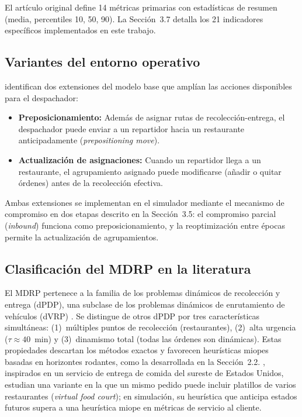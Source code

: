 \documentclass[12pt,letterpaper,oneside]{book}
\begin{document}
	El artículo original define 14 métricas primarias con estadísticas de
	resumen (media, percentiles 10, 50, 90).  La Sección~3.7 detalla los 21
	indicadores específicos implementados en este trabajo.

	\subsection{Variantes del entorno operativo}
	\label{sec:variantes_entorno}

	\citet{Reyes2018} identifican dos extensiones del modelo base que amplían
	las acciones disponibles para el despachador:

	\begin{itemize}
		\item \textbf{Preposicionamiento:} Además de asignar rutas de
		      recolección-entrega, el despachador puede enviar a un repartidor hacia
		      un restaurante anticipadamente (\textit{prepositioning move}).

		\item \textbf{Actualización de asignaciones:} Cuando un repartidor llega a
		      un restaurante, el agrupamiento asignado puede modificarse
		      (añadir o quitar órdenes) antes de la recolección efectiva.
	\end{itemize}

	Ambas extensiones se implementan en el simulador mediante el mecanismo de
	compromiso en dos etapas descrito en la Sección~3.5: el compromiso
	parcial (\textit{inbound}) funciona como preposicionamiento, y la reoptimización
	entre épocas permite la actualización de agrupamientos.

	\subsection{Clasificación del MDRP en la literatura}

	El MDRP pertenece a la familia de los problemas dinámicos de
	recolección y entrega (dPDP), una subclase de los problemas dinámicos de
	enrutamiento de vehículos (dVRP) \citep{Pillac2013}.  Se distingue de otros dPDP
	por tres características simultáneas: (1)~múltiples puntos de recolección
	(restaurantes), (2)~alta urgencia ($\tau \approx 40$~min) y
	(3)~dinamismo total (todas las órdenes son dinámicas).  Estas propiedades
	descartan los métodos exactos y favorecen heurísticas miopes basadas en
	horizontes rodantes, como la desarrollada en la Sección~2.2.
	\citet{Steever2019}, inspirados en un servicio de entrega de comida del
	sureste de Estados Unidos, estudian una variante en la que un mismo pedido
	puede incluir platillos de varios restaurantes (\textit{virtual food court});
	en simulación, su heurística que anticipa estados futuros supera a una
	heurística miope en métricas de servicio al cliente.
\end{document}
